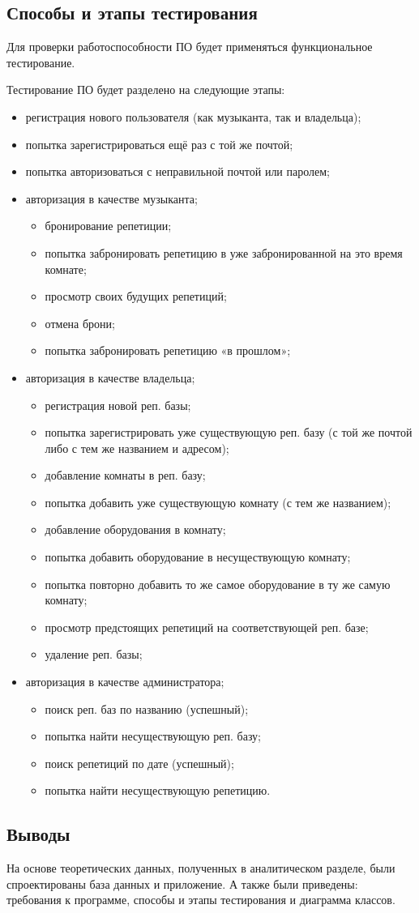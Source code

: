 \subsection{Способы и этапы тестирования}

Для проверки работоспособности ПО будет применяться функциональное тестирование.

Тестирование ПО будет разделено на следующие этапы:
\begin{itemize}
	\item регистрация нового пользователя (как музыканта, так и владельца);
	\item попытка зарегистрироваться ещё раз с той же почтой;
	\item попытка авторизоваться с неправильной почтой или паролем;
	\item авторизация в качестве музыканта;
	\begin{itemize}
		\item бронирование репетиции;
		\item попытка забронировать репетицию в уже забронированной на это время комнате;
		\item просмотр своих будущих репетиций;
		\item отмена брони;
		\item попытка забронировать репетицию «в прошлом»;
	\end{itemize}
	\item авторизация в качестве владельца;
	\begin{itemize}
		\item регистрация новой реп. базы;
		\item попытка зарегистрировать уже существующую реп. базу (с той же почтой либо с тем же названием и адресом);
		\item добавление комнаты в реп. базу;
		\item попытка добавить уже существующую комнату (с тем же названием);
		\item добавление оборудования в комнату;
		\item попытка добавить оборудование в несуществующую комнату;
		\item попытка повторно добавить то же самое оборудование в ту же самую комнату;
		\item просмотр предстоящих репетиций на соответствующей реп. базе;
		\item удаление реп. базы;
	\end{itemize}
	\item авторизация в качестве администратора;
	\begin{itemize}
		\item поиск реп. баз по названию (успешный);
		\item попытка найти несуществующую реп. базу;
		\item поиск репетиций по дате (успешный);
		\item попытка найти несуществующую репетицию.
	\end{itemize}
\end{itemize}

\subsection*{Выводы}

На основе теоретических данных, полученных в аналитическом разделе, были спроектированы база данных и приложение. А также были приведены: требования к программе, способы и этапы тестирования и диаграмма классов.

